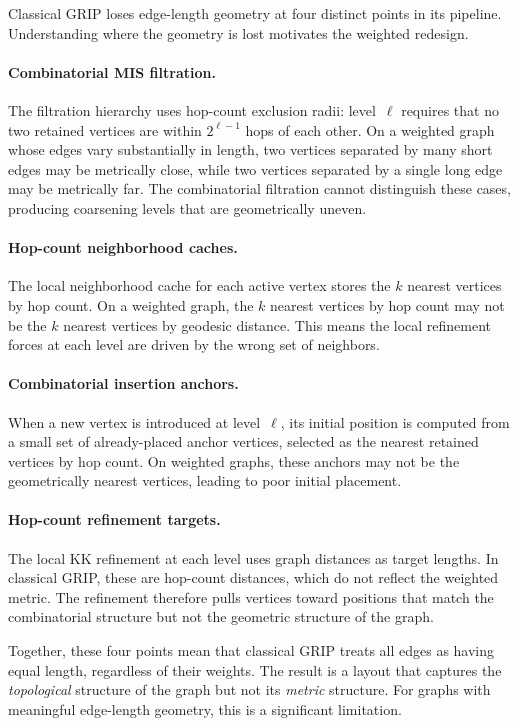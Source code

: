 \documentclass[11pt,twocolumn]{article}
\begin{document}
Classical GRIP loses edge-length geometry at four distinct points in its
pipeline.  Understanding where the geometry is lost motivates the
weighted redesign.

\paragraph{Combinatorial MIS filtration.}
The filtration hierarchy uses hop-count exclusion radii: level~$\ell$
requires that no two retained vertices are within $2^{\ell-1}$ hops of
each other.  On a weighted graph whose edges vary substantially in
length, two vertices separated by many short edges may be metrically
close, while two vertices separated by a single long edge may be
metrically far.  The combinatorial filtration cannot distinguish these
cases, producing coarsening levels that are geometrically uneven.

\paragraph{Hop-count neighborhood caches.}
The local neighborhood cache for each active vertex stores the $k$
nearest vertices by hop count.  On a weighted graph, the $k$ nearest
vertices by hop count may not be the $k$ nearest vertices by geodesic
distance.  This means the local refinement forces at each level are
driven by the wrong set of neighbors.

\paragraph{Combinatorial insertion anchors.}
When a new vertex is introduced at level~$\ell$, its initial position is
computed from a small set of already-placed anchor vertices, selected as
the nearest retained vertices by hop count.  On weighted graphs, these
anchors may not be the geometrically nearest vertices, leading to poor
initial placement.

\paragraph{Hop-count refinement targets.}
The local KK refinement at each level uses graph distances as target
lengths.  In classical GRIP, these are hop-count distances, which do not
reflect the weighted metric.  The refinement therefore pulls vertices
toward positions that match the combinatorial structure but not the
geometric structure of the graph.

Together, these four points mean that classical GRIP treats all edges as
having equal length, regardless of their weights.  The result is a layout
that captures the \emph{topological} structure of the graph but not its
\emph{metric} structure.  For graphs with meaningful edge-length
geometry, this is a significant limitation.
\end{document}
